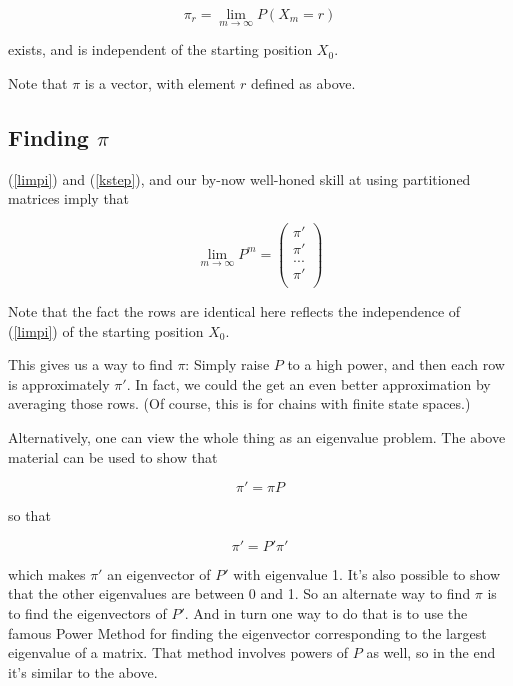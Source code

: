 \begin{equation}
\label{limpi}
\pi_r = \lim_{m \rightarrow \infty} P(X_m = r)
\end{equation}

exists, and is independent of the starting position $X_0$.

Note that $\pi$ is a vector, with element $r$ defined as above.

\subsection{Finding $\pi$}

(\ref{limpi}) and (\ref{kstep}), and our by-now well-honed skill at
using partitioned matrices imply that 

\begin{equation}
\lim_{m \rightarrow \infty} P^m = 
\left (
\begin{array}{r}
\pi' \\
\pi' \\
... \\
\pi' \\
\end{array}
\right )
\end{equation}

Note that the fact the rows are identical here reflects the independence
of (\ref{limpi}) of the starting position $X_0$.

This gives us a way to find $\pi$:  Simply raise $P$ to a high power,
and then each row is approximately $\pi'$.  In fact, we could the get an
even better approximation by averaging those rows.  (Of course, this is
for chains with finite state spaces.)

Alternatively, one can view the whole thing as an eigenvalue problem.
The above material can be used to show that

\begin{equation}
\pi' = \pi P
\end{equation}

so that 

\begin{equation}
\pi' = P' \pi' 
\end{equation}

which makes $\pi'$ an eigenvector of $P'$ with eigenvalue 1.  It's also
possible to show that the other eigenvalues are between 0 and 1.  So an
alternate way to find $\pi$ is to find the eigenvectors of $P'$.  And in
turn one way to do that is to use the famous Power Method for finding
the eigenvector corresponding to the largest eigenvalue of a matrix.
That method involves powers of $P$ as well, so in the end it's similar
to the above.

